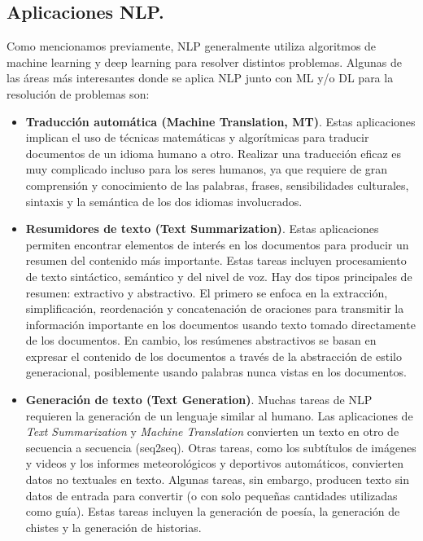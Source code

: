 \documentclass[12pt,a4paper]{article}
\begin{document}
\begin{sloppypar}
\cleardoublepage

\subsection{Aplicaciones NLP.}\label{Aplicaciones_NLP}

Como mencionamos previamente, NLP generalmente utiliza algoritmos de machine learning y deep learning para resolver distintos problemas. Algunas de las áreas más interesantes donde se aplica NLP junto con ML y/o DL para la resolución de problemas son\cite{NLP_5, NLP_6}:

\begin{itemize}
\item \textbf{Traducción automática (Machine Translation, MT)}. Estas aplicaciones implican el uso de técnicas matemáticas y algorítmicas para traducir documentos de un idioma humano a otro. Realizar una traducción eficaz es muy complicado incluso para los seres humanos, ya que requiere de gran comprensión y conocimiento de las palabras, frases, sensibilidades culturales, sintaxis y la semántica de los dos idiomas involucrados. 

\item \textbf{Resumidores de texto (Text Summarization)}. Estas aplicaciones permiten encontrar elementos de interés en los documentos para producir un resumen del contenido más importante. Estas tareas incluyen procesamiento de texto sintáctico, semántico y del nivel de voz. Hay dos tipos principales de resumen: extractivo y abstractivo. El primero se enfoca en la extracción, simplificación, reordenación y concatenación de oraciones para transmitir la información importante en los documentos usando texto tomado directamente de los documentos. En cambio, los resúmenes abstractivos se basan en expresar el contenido de los documentos a través de la abstracción de estilo generacional, posiblemente usando palabras nunca vistas en los documentos.

\item \textbf{Generación de texto (Text Generation)}. Muchas tareas de NLP requieren la generación de un lenguaje similar al humano. Las aplicaciones de \textit{Text Summarization} y \textit{Machine Translation} convierten un texto en otro de secuencia a secuencia (seq2seq). Otras tareas, como los subtítulos de imágenes y videos y los informes meteorológicos y deportivos automáticos, convierten datos no textuales en texto. Algunas tareas, sin embargo, producen texto sin datos de entrada para convertir (o con solo pequeñas cantidades utilizadas como guía). Estas tareas incluyen la generación de poesía, la generación de chistes y la generación de historias.


\end{itemize}
\end{sloppypar}
\end{document}
